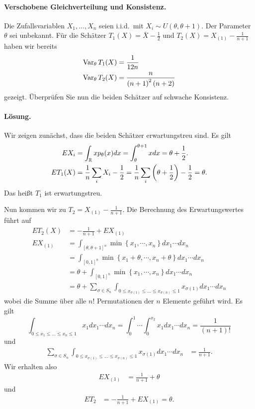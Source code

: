 \paragraph{Verschobene Gleichverteilung und Konsistenz.} 
Die Zufallsvariablen $X_1,\ldots,X_n$ seien i.i.d.\ mit $X_i\sim U(\theta,\theta+1)$.
Der Parameter $\theta$ sei unbekannt. Für die Schätzer $T_1(X) = \bar X -\frac{1}{2}$
und $T_2(X)=X_{(1)} - \frac{1}{n+1}$ haben wir bereits
\begin{align*}
    \operatorname{Var}_\theta T_1(X) &= \frac{1}{12 n} \\
    \operatorname{Var}_\theta T_2(X) &= \frac{n}{\left( n+1 \right)^2\left( n+2 \right)}
\end{align*}
gezeigt. Überprüfen Sie nun die beiden Schätzer auf schwache Konsistenz.

\paragraph*{Lösung.} 
Wir zeigen zunächst, dass die beiden Schätzer erwartungstreu sind. 
Es gilt
\begin{align*}
	E X_i &=  \int_{\mathbb R}^{} x p_\theta(x) dx 
        = \int_{\theta}^{\theta+1} x dx = \theta + \frac{1}{2}. \\
	E T_1(X) &=  \frac{1}{n} \sum_{i}^{} X_i - \frac{1}{2} 
        = \frac{1}{n} \sum_{i}^{} \left( \theta + \frac{1}{2} \right) -\frac{1}{2} = \theta.
\end{align*}
Das heißt $T_1$ ist erwartungstreu.

Nun kommen wir zu $T_2 = X_{(1)}-\frac{1}{n+1}$. Die Berechnung des Erwartungswertes führt auf
\begin{align*}
	E T_2(X) &= -\frac{1}{n+1} + E X_{(1)} \\
	E X_{(1)} &= \int_{[\theta,\theta+1]^n}^{} \min\left\{ x_1,\cdots,x_n \right\} dx_1\cdots d x_n \\
	&= \int_{[0,1]^n}^{} \min\left\{ x_1+\theta,\cdots,x_n+\theta \right\} dx_1\cdots d x_n \\
	&= \theta + \int_{[0,1]^n}^{} \min\left\{ x_1,\cdots,x_n \right\} dx_1\cdots d x_n \\
	&= \theta +\sum_{\sigma\in S_n}^{} \int_{0\leq x_{\sigma(1)}\leq \ldots \leq x_{\sigma(n)}\leq 1} x_{\sigma(1)} dx_1 \cdots dx_n 
\end{align*}
wobei die Summe über alle $n!$ Permutationen der $n$ Elemente geführt wird. Es
gilt
\begin{equation*}
	\int_{0\leq x_1\leq \ldots\leq x_n\leq 1} x_1 dx_1 \cdots d x_n = 
	\int_{0}^{1}\cdots \int_{0}^{x_2} x_1 dx_1 \cdots dx_n = 
	\frac{1}{\left( n+1 \right)!}
\end{equation*}
und
\begin{align*}
	\sum_{\sigma\in S_n}^{} \int_{0\leq x_{\sigma(1)}\leq \ldots \leq x_{\sigma(n)}\leq 1} x_{\sigma(1)} dx_1 \cdots dx_n 
	&=\frac{1}{n+1}.
\end{align*}
Wir erhalten also
\begin{align*}
	E X_{(1)} &= \frac{1}{n+1} + \theta
\end{align*}
und 
\begin{align*}
	E T_2 &= -\frac{1}{n+1} + E X_{(1)} = \theta.
\end{align*}

